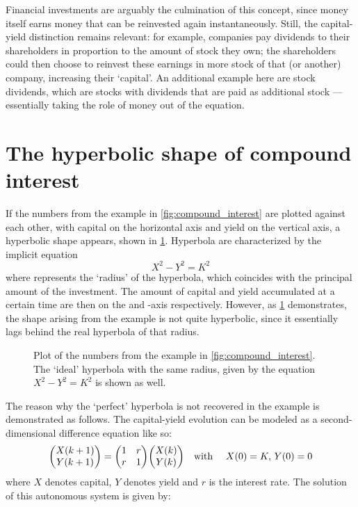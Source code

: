 Financial investments are arguably the culmination of this concept, since money itself earns money that can be reinvested again instantaneously. Still, the capital-yield distinction remains relevant: for example, companies pay dividends to their shareholders in proportion to the amount of stock they own; the shareholders could then choose to reinvest these earnings in more stock of that (or another) company, increasing their `capital'. An additional example here are stock dividends, which are stocks with dividends that are paid as additional stock --- essentially taking the role of money out of the equation.

\section{The hyperbolic shape of compound interest}
If the numbers from the example in \cref{fig:compound_interest} are plotted against each other, with capital on the horizontal axis and yield on the vertical axis, a hyperbolic shape appears, shown in \cref{fig:hyperbolic_compounding}. Hyperbola are characterized by the implicit equation 
\begin{equation}
    X^2 - Y^2 = K^2
    \label{eq:hyperbola}
\end{equation}
where  represents the `radius' of the hyperbola, which coincides with the principal amount of the investment. The amount of capital and yield accumulated at a certain time are then on the  and -axis respectively. However, as \cref{fig:hyperbolic_compounding} demonstrates, the shape arising from the example is not quite hyperbolic, since it essentially lags behind the real hyperbola of that radius.
\begin{figure}[h!]
    \centering
    
    \caption{Plot of the numbers from the example in \cref{fig:compound_interest}. The `ideal' hyperbola with the same radius, given by the equation $X^2 - Y^2 = K^2$ is shown as well.}
    \label{fig:hyperbolic_compounding}
\end{figure}
The reason why the `perfect' hyperbola is not recovered in the example is demonstrated as follows. The capital-yield evolution can be modeled as a second-dimensional difference equation like so:
$$ \mqty(X(k+1)\\Y(k+1)) = \mqty(1& r \\ r & 1)\mqty(X(k)\\Y(k))\qq{with }X(0) = K,\, Y(0) = 0 $$
where $X$ denotes capital, $Y$ denotes yield and $r$ is the interest rate. The solution of this autonomous system is given by:
